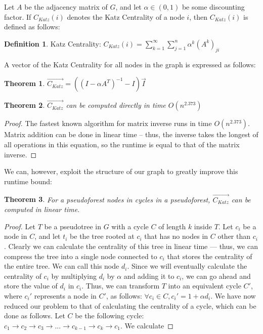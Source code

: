 \documentclass[10pt]{article}
\newtheorem{theorem}{Theorem}[section]
\theoremstyle{definition}
\newtheorem{definition}{Definition}[section]
\begin{document}
Let $A$ be the adjacency matrix of $G$, and let $\alpha \in (0,1)$ be some discounting factor. If $C_{Katz}(i)$ denotes the Katz Centrality of a node $i$, then $C_{Katz}(i)$ is defined as follows:
\theoremstyle{definition}
\begin{definition}{Katz Centrality:}
$C_{Katz}(i) = \sum\limits_{k=1}^{\infty}\sum\limits_{j=1}^n\alpha^k(A^k)_{ji}$
\end{definition}

A vector of the Katz Centrality for all nodes in the graph is expressed as follows:

\begin{theorem}
$\overrightarrow{C_{Katz}}  = ((I - \alpha A^T)^{-1}-I)\vec{I}$
\end{theorem}

\begin{theorem}
$\overrightarrow{C_{Katz}}$ can be computed directly in time $O(n^{2.373})$
\end{theorem}
\begin{proof}
The fastest known algorithm for matrix inverse runs in time $O(n^2.373)$. Matrix addition can be done in linear time -- thus, the inverse takes the longest of all operations in this equation, so the runtime is equal to that of the matrix inverse.
\end{proof}

We can, however, exploit the structure of our graph to greatly improve this runtime bound:

\begin{theorem}
For a pseudoforest nodes in cycles in a pseudoforest, $\overrightarrow{C_{Katz}}$ can be computed in linear time.
\end{theorem}

\begin{proof}
Let $T$ be a pseudotree in $G$ with a cycle $C$ of length $k$ inside $T$. Let $c_i$ be a node in $C$, and let $t_i$ be the tree rooted at  $c_i$ that has no nodes in $C$ other than $c_i$. Clearly we can calculate the centrality of this tree in linear time --- thus, we can compress the tree into a single node connected to $c_i$ that stores the centrality of the entire tree. We can call this node $d_i$. Since we will eventually calculate the centrality of $c_i$ by multiplying $d_i$ by $\alpha$ and adding it to $c_i$, we can go ahead and store the value of $d_i$ in $c_i$. Thus, we can transform $T$ into an equivalent cycle $C'$, where $c_i'$ represents a node in $C'$, as follows: $\forall c_i \in C, c_i' = 1 + \alpha d_i$.  We have now reduced our problem to that of calculating the centrality of a cycle, which can be done as follows. Let $C$ be the following cycle: $c_1 \rightarrow c_2 \rightarrow c_3 \rightarrow ... \rightarrow c_{k-1} \rightarrow c_k \rightarrow c_1$.  We calculate 
\end{proof}
\end{document}
